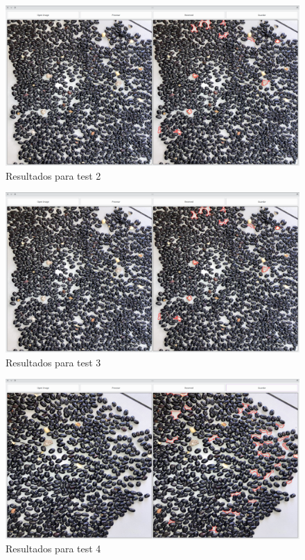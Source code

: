 \documentclass[conference]{IEEEtran}
\begin{document}
        \begin{figure}[H]
            \centering
            \includegraphics[width=\breite\linewidth]{images/test2.png}
            \caption{Resultados para test 2}
            \label{fig:test2}
        \end{figure}

        \begin{figure}[H]
            \centering
            \includegraphics[width=\breite\linewidth]{images/test3.png}
            \caption{Resultados para test 3}
            \label{fig:test3}
        \end{figure}

        \begin{figure}[H]
            \centering
            \includegraphics[width=\breite\linewidth]{images/test4.png}
            \caption{Resultados para test 4}
            \label{fig:test4}
        \end{figure}
\end{document}
